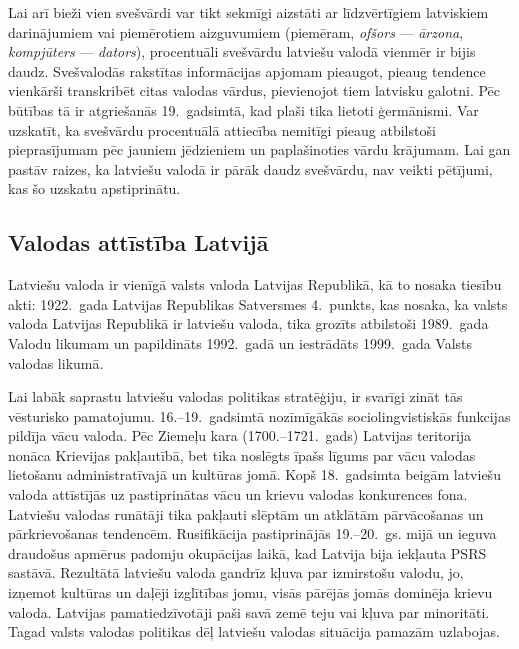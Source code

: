 \begin{multicols}{2}
Lai arī bieži vien svešvārdi var tikt sekmīgi aizstāti ar līdzvērtīgiem latviskiem darinājumiem vai piemērotiem aizguvumiem (piemēram, \textit{ofšors} — \textit{ārzona}, \textit{kompjūters} — \textit{dators}), procentuāli svešvārdu latviešu valodā vienmēr ir bijis daudz. 
Svešvalodās rakstītas informācijas apjomam pieaugot, pieaug tendence vienkārši transkribēt citas valodas vārdus, pievienojot tiem latvisku galotni. 
Pēc būtības tā ir atgriešanās 19.~gadsimtā, kad plaši tika lietoti ģermānismi. 
Var uzskatīt, ka svešvārdu procentuālā attiecība nemitīgi pieaug atbilstoši pieprasījumam pēc jauniem jēdzieniem un paplašinoties vārdu krājumam. 
Lai gan pastāv raizes, ka latviešu valodā ir pārāk daudz svešvārdu, nav veikti pētījumi, kas šo uzskatu apstiprinātu.

\subsection{Valodas attīstība Latvijā}


Latviešu valoda ir vienīgā valsts valoda Latvijas Republikā, kā to nosaka tiesību akti: 1922.~gada Latvijas Republikas Satversmes 4.~punkts, kas nosaka, ka valsts valoda Latvijas Republikā ir latviešu valoda, tika grozīts atbilstoši 1989.~gada Valodu likumam un papildināts 1992.~gadā un iestrādāts 1999.~gada Valsts valodas likumā.


Lai labāk saprastu latviešu valodas politikas stratēģiju, ir svarīgi zināt tās vēsturisko pamatojumu.
16.–19.~gadsimtā nozīmīgākās sociolingvistiskās funkcijas pildīja vācu valoda. 
Pēc Ziemeļu kara (1700.–1721.~gads) Latvijas teritorija nonāca Krievijas pakļautībā, bet tika noslēgts īpašs līgums par vācu valodas lietošanu administratīvajā un kultūras jomā. 
Kopš 18.~gadsimta beigām latviešu valoda attīstījās uz pastiprinātas vācu un krievu valodas konkurences fona. 
Latviešu valodas runātāji tika pakļauti slēptām un atklātām pārvācošanas un pārkrievošanas tendencēm. 
Rusifikācija pastiprinājās 19.–20.~gs. mijā un ieguva draudošus apmērus padomju okupācijas laikā, kad Latvija bija iekļauta PSRS sastāvā. 
Rezultātā latviešu valoda gandrīz kļuva par izmirstošu valodu, jo, izņemot kultūras un daļēji izglītības jomu, visās pārējās jomās dominēja krievu valoda. 
Latvijas pamatiedzīvotāji paši savā zemē teju vai kļuva par minoritāti. 
Tagad valsts valodas politikas dēļ latviešu valodas situācija pamazām uzlabojas.


\end{multicols}
